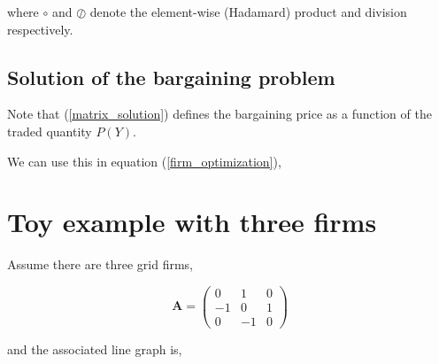 \documentclass[american]{scrartcl}
\newcommand{\matr}[1]{\bm{#1}}
\begin{document}
where $\circ$ and $\oslash$ denote the element-wise (Hadamard) product and division respectively.

\subsection{Solution of the bargaining problem}

Note that (\ref{matrix_solution}) defines the bargaining price as a function of the traded quantity $P(Y)$.

We can use this in equation (\ref{firm_optimization}),

\newpage

\section{Toy example with three firms}

Assume there are three grid firms, \hspace{2em}

\vspace{0.5cm}
\begin{minipage}{0.6\textwidth}
\end{minipage} \hfill
\begin{minipage}{0.35\textwidth}
	\begin{equation*}
		\matr{A} = \begin{pmatrix}
			0   & 1  & 0 \\
			- 1 & 0  & 1 \\
			0   & -1 & 0
		\end{pmatrix}
	\end{equation*}
\end{minipage}
\vspace{0.5cm}


and the associated line graph is,
\end{document}
